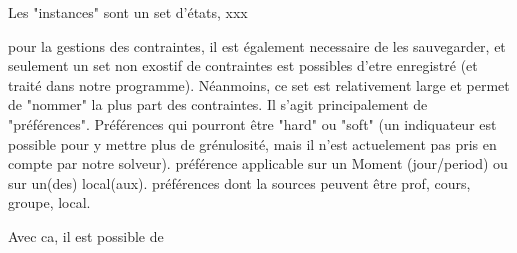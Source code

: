 Les "instances" sont un set d'états, xxx

pour la gestions des contraintes, il est également necessaire de les sauvegarder, et seulement un set non exostif de contraintes est possibles d'etre enregistré (et traité dans notre programme). Néanmoins, ce set est relativement large et permet de "nommer" la plus part des contraintes.  Il s'agit principalement de "préférences".  Préférences qui pourront être "hard" ou "soft" (un indiquateur est possible pour y mettre plus de grénulosité, mais il n'est actuelement pas pris en compte par notre solveur).  préférence applicable sur un Moment (jour/period) ou sur un(des) local(aux).  préférences dont la sources peuvent être prof, cours, groupe, local.

Avec ca, il est possible de 


